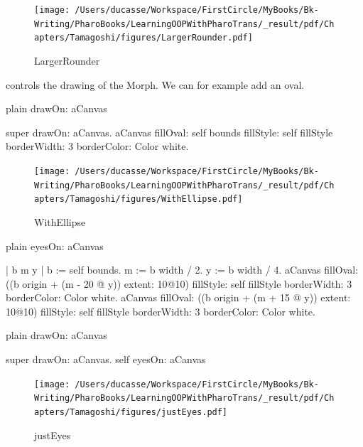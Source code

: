 \documentclass[10pt,twoside,english]{_support/latex/sbabook/sbabook}
\begin{document}
\begin{figure}

\begin{center}
\texttt{[image: /Users/ducasse/Workspace/FirstCircle/MyBooks/Bk-Writing/PharoBooks/LearningOOPWithPharoTrans/\_result/pdf/Chapters/Tamagoshi/figures/LargerRounder.pdf]}\caption{LargerRounder\label{LargerRounder}}\end{center}
\end{figure}


    controls the drawing of the Morph. We can for example add an oval. 

\begin{displaycode}{plain}
drawOn: aCanvas

	super drawOn: aCanvas.
	aCanvas fillOval: self bounds
			fillStyle: self fillStyle 
			borderWidth: 3
			borderColor: Color white.
\end{displaycode}


\begin{figure}

\begin{center}
\texttt{[image: /Users/ducasse/Workspace/FirstCircle/MyBooks/Bk-Writing/PharoBooks/LearningOOPWithPharoTrans/\_result/pdf/Chapters/Tamagoshi/figures/WithEllipse.pdf]}\caption{WithEllipse\label{WithEllipse}}\end{center}
\end{figure}


\begin{displaycode}{plain}
eyesOn: aCanvas

	| b m y |
	b := self bounds.
	m := b width / 2.
	y := b width / 4.
	aCanvas 
			fillOval: ((b origin   + (m - 20 @ y)) extent: 10@10)
			fillStyle: self fillStyle 
			borderWidth: 3
			borderColor: Color white.
	aCanvas 
			fillOval: ((b origin   + (m + 15 @ y)) extent: 10@10)
			fillStyle: self fillStyle 
			borderWidth: 3
			borderColor: Color white.
\end{displaycode}

\begin{displaycode}{plain}
drawOn: aCanvas

	super drawOn: aCanvas.
	self eyesOn: aCanvas
\end{displaycode}


\begin{figure}

\begin{center}
\texttt{[image: /Users/ducasse/Workspace/FirstCircle/MyBooks/Bk-Writing/PharoBooks/LearningOOPWithPharoTrans/\_result/pdf/Chapters/Tamagoshi/figures/justEyes.pdf]}\caption{justEyes\label{justEyes}}\end{center}
\end{figure}
\end{document}
